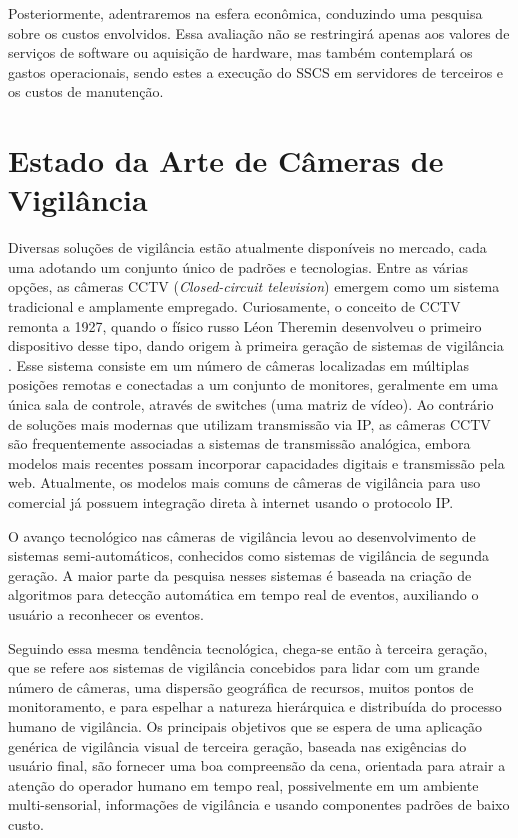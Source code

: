 \documentclass[12pt, %
openright, 
oneside, %
a4paper,    %
brazil]{facom-ufu-abntex2}
\begin{document}
Posteriormente, adentraremos na esfera econômica, conduzindo uma pesquisa sobre
os custos envolvidos. Essa avaliação não se restringirá apenas aos valores de
serviços de software ou aquisição de hardware, mas também contemplará os gastos
operacionais, sendo estes a execução do SSCS em servidores de terceiros e os
custos de manutenção.

\section{Estado da Arte de Câmeras de Vigilância}

Diversas soluções de vigilância estão atualmente disponíveis no mercado, cada
uma adotando um conjunto único de padrões e tecnologias. Entre as várias
opções, as câmeras CCTV (\textit{\foreignlanguage{english}{Closed-circuit
		television}}) emergem como um sistema tradicional e amplamente empregado.
Curiosamente, o conceito de CCTV remonta a 1927, quando o físico russo Léon
Theremin desenvolveu o primeiro dispositivo desse tipo, dando origem à primeira
geração de sistemas de vigilância \cite{glinsky2000theremin}. Esse sistema
consiste em um número de câmeras localizadas em múltiplas posições remotas e
conectadas a um conjunto de monitores, geralmente em uma única sala de
controle, através de switches (uma matriz de vídeo). Ao contrário de soluções
mais modernas que utilizam transmissão via IP, as câmeras CCTV são
frequentemente associadas a sistemas de transmissão analógica, embora modelos
mais recentes possam incorporar capacidades digitais e transmissão pela web.
Atualmente, os modelos mais comuns de câmeras de vigilância para uso comercial
já possuem integração direta à internet usando o protocolo IP.

O avanço tecnológico nas câmeras de vigilância levou ao desenvolvimento de
sistemas semi-automáticos, conhecidos como sistemas de vigilância de segunda
geração. A maior parte da pesquisa nesses sistemas é baseada na criação de
algoritmos para detecção automática em tempo real de eventos, auxiliando o
usuário a reconhecer os eventos.

Seguindo essa mesma tendência tecnológica, chega-se então à terceira geração,
que se refere aos sistemas de vigilância concebidos para lidar com um grande
número de câmeras, uma dispersão geográfica de recursos, muitos pontos de
monitoramento, e para espelhar a natureza hierárquica e distribuída do processo
humano de vigilância. Os principais objetivos que se espera de uma aplicação
genérica de vigilância visual de terceira geração, baseada nas exigências do
usuário final, são fornecer uma boa compreensão da cena, orientada para atrair
a atenção do operador humano em tempo real, possivelmente em um ambiente
multi-sensorial, informações de vigilância e usando componentes padrões de
baixo custo.
\end{document}
